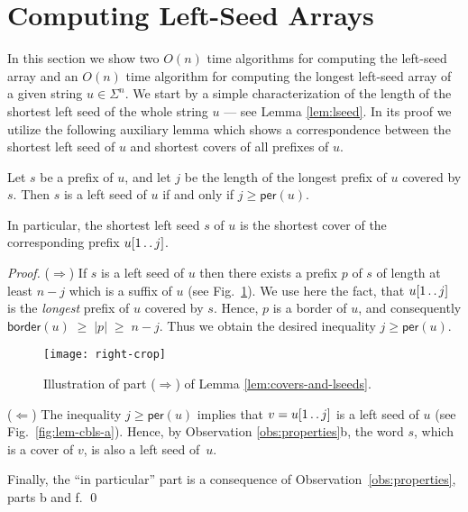 \documentclass{llncs}
\newcommand{\per}{\textsf{per}}
\newcommand{\border}{\textsf{border}}
\def\dotdot{\mathinner{\ldotp\ldotp}}
\begin{document}
  \section{Computing Left-Seed Arrays} \label{sec:LSeed}

  In this section we show two $O(n)$ time algorithms for computing the left-seed
  array and an $O(n)$ time algorithm  for computing the longest left-seed array of a given string $u \in \Sigma^n$.
  We start by a simple characterization of the length of the shortest left
  seed of the whole string $u$ --- see Lemma \ref{lem:lseed}.
  In its proof we utilize the following auxiliary lemma which shows
  a correspondence between the shortest left seed of $u$ and shortest covers of all
  prefixes of $u$.

  \begin{lemma}\label{lem:covers-and-lseeds}
    Let $s$ be a prefix of $u$, and let $j$ be the length of the longest
    prefix of $u$ covered by $s$.
    Then $s$ is a left seed of $u$ if and only if $j \ge \per(u)$.

    In particular, the shortest left seed $s$ of $u$ is the shortest cover of
    the corresponding prefix $u[1 \dotdot j]$.
  \end{lemma}

  \begin{proof}
    ($\Rightarrow$)
    If $s$ is a left seed of $u$ then there exists a prefix $p$ of $s$ of length at least
    $n-j$ which is a suffix of $u$ (see Fig.~\ref{fig:lem-cbls-b}). 
    We use here the fact, that $u[1 \dotdot j]$ is the \emph{longest} prefix 
    of $u$ covered by $s$.
    Hence, $p$ is a border of $u$, and consequently
    $\border(u) \;\ge\; |p| \;\ge\; n-j$.
    Thus we obtain the desired inequality $j \ge \per(u)$.

\begin{figure}
\begin{center}
  \texttt{[image: right-crop]}
\end{center}
\caption{\label{fig:lem-cbls-b}
  Illustration of part ($\Rightarrow$) of Lemma \ref{lem:covers-and-lseeds}.
}
\end{figure}

    ($\Leftarrow$)
    The inequality $j \ge \per(u)$ implies that $v=u[1 \dotdot j]$ is a left seed of $u$
    (see Fig.~\ref{fig:lem-cbls-a}).
    Hence, by Observation \ref{obs:properties}b, the word $s$, which is a cover of $v$,
    is also a left seed of~$u$.

    Finally, the ``in particular'' part is a consequence of Observation~\ref{obs:properties},
    parts b and f.
  \qed
  \end{proof}
\end{document}
